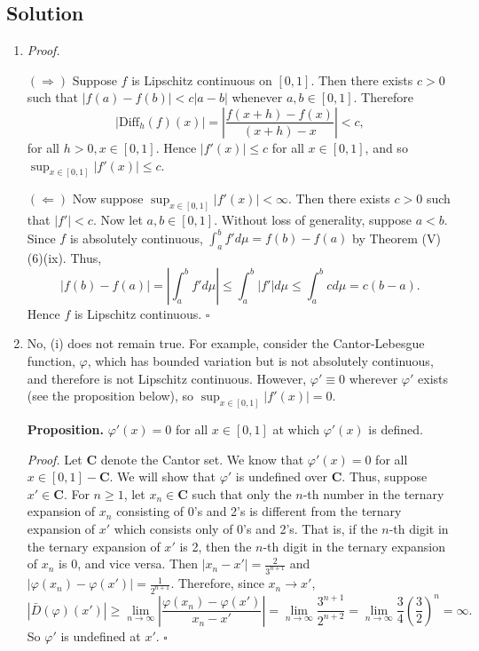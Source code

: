 \documentclass[12pt]{article}
\newcounter{ProofCounter}
\newenvironment{Proof}{\stepcounter{ProofCounter}\textit{Proof.}}{\hfill$\square$}
\begin{document}
\subsection*{Solution}
\begin{enumerate}[label=(\roman*)]
\item 
\begin{Proof}

$(\Rightarrow)$ Suppose $f$ is Lipschitz continuous on $[0,1]$. Then there exists $c > 0$ such that $|f(a) - f(b)| < c|a - b|$ whenever $a,b \in
[0,1]$. Therefore 
\[ |\text{Diff}_{h}(f)(x)| = \left| \frac{f(x + h) - f(x)}{(x + h) - x}\right| < c, \]
for all $h > 0, x \in [0,1]$. Hence $|f'(x)| \leq c$ for all $x \in [0,1]$, and so $\sup_{x \in [0,1]}|f'(x)| \leq c$.

$(\Leftarrow)$ Now suppose $\sup_{x \in [0,1]}|f'(x)| < \infty$. Then there exists $c > 0$ such that $|f'| < c$. Now let $a,b \in [0,1]$. Without loss
of generality, suppose $a < b$. Since $f$ is absolutely continuous, $\int_{a}^{b}f'd\mu = f(b) - f(a)$ by Theorem (V)(6)(ix). Thus,
\[ |f(b) - f(a)| = \left| \int_{a}^{b}f'd\mu \right| \leq \int_{a}^{b}|f'|d\mu \leq \int_{a}^{b}cd\mu = c(b - a). \]
Hence $f$ is Lipschitz continuous.
\end{Proof}

\item No, (i) does not remain true. For example, consider the Cantor-Lebesgue function, $\varphi$, which has bounded variation but is not absolutely continuous,
and therefore is not Lipschitz continuous. However, $\varphi' \equiv 0$ wherever $\varphi'$ exists (see the proposition below), so $\sup_{x\in [0,1]}|f'(x)| = 0$. 

\vspace{5mm}
{\bf Proposition.} $\varphi'(x) = 0$ for all $x \in [0,1]$ at which $\varphi'(x)$ is defined.

\begin{Proof}
Let $\bm{C}$ denote the Cantor set. We know that $\varphi'(x) = 0$ for all $x \in [0,1] - \bm{C}$. We will show that $\varphi'$ is undefined over $\bm{C}$. Thus, suppose $x' \in \bm{C}$.
For $n \geq 1$, let $x_{n} \in \bm{C}$ such that only the $n$-th number in the ternary expansion of $x_{n}$ consisting of 0's and 2's is
different from the ternary expansion of $x'$ which consists only of 0's and 2's. That is, if the $n$-th digit in the ternary expansion of $x'$ is 2,
then the $n$-th digit in the ternary expansion of $x_{n}$ is 0, and vice versa. Then $|x_{n} - x'| = \frac{2}{3^{n + 1}}$ and $|\varphi(x_{n}) -
\varphi(x')| = \frac{1}{2^{n+1}}$. Therefore, since $x_{n} \rightarrow x'$,
\[ |\bar{D}(\varphi)(x')| \geq \lim_{n\rightarrow\infty}\left|\frac{\varphi(x_{n}) - \varphi(x')}{x_{n} - x'}\right| =
\lim_{n\rightarrow\infty}\frac{3^{n+1}}{2^{n+2}} = \lim_{n\rightarrow\infty}\frac{3}{4}\left( \frac{3}{2} \right)^{n} = \infty. \]
So $\varphi'$ is undefined at $x'$.
\end{Proof}
\end{enumerate}
\end{document}
